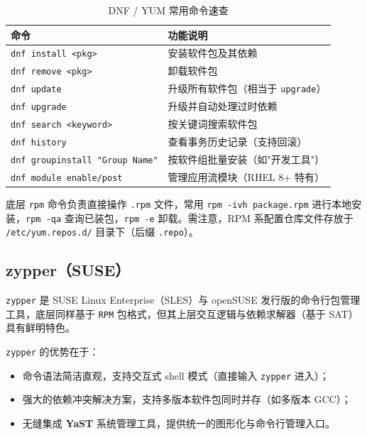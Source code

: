 \documentclass[12pt,UTF8]{ctexbook}
\begin{document}
\begin{table}[htbp]
	\centering
	\caption{DNF / YUM 常用命令速查}
	\begin{tabular}{@{}ll@{}}
		\toprule
		\textbf{命令} & \textbf{功能说明} \\
		\midrule
		\verb|dnf install <pkg>| & 安装软件包及其依赖 \\
		\verb|dnf remove <pkg>| & 卸载软件包 \\
		\verb|dnf update| & 升级所有软件包（相当于 \verb|upgrade|） \\
		\verb|dnf upgrade| & 升级并自动处理过时依赖 \\
		\verb|dnf search <keyword>| & 按关键词搜索软件包 \\
		\verb|dnf history| & 查看事务历史记录（支持回滚） \\
		\verb|dnf groupinstall "Group Name"| & 按软件组批量安装（如"开发工具"） \\
		\verb|dnf module enable/post| & 管理应用流模块（RHEL 8+ 特有） \\
		\bottomrule
	\end{tabular}
\end{table}

底层 \texttt{rpm} 命令负责直接操作 \texttt{.rpm} 文件，常用 \verb|rpm -ivh package.rpm| 进行本地安装，\verb|rpm -qa| 查询已装包，\verb|rpm -e| 卸载。需注意，RPM 系配置仓库文件存放于 \texttt{/etc/yum.repos.d/} 目录下（后缀 \texttt{.repo}）。

\subsection{zypper（SUSE）}

\texttt{zypper} 是 SUSE Linux Enterprise（SLES）与 openSUSE 发行版的命令行包管理工具，底层同样基于 \texttt{RPM} 包格式，但其上层交互逻辑与依赖求解器（基于 SAT）具有鲜明特色。

\texttt{zypper} 的优势在于：
\begin{itemize}
	\item 命令语法简洁直观，支持交互式 shell 模式（直接输入 \verb|zypper| 进入）；
	\item 强大的依赖冲突解决方案，支持多版本软件包同时并存（如多版本 GCC）；
	\item 无缝集成 \textbf{YaST} 系统管理工具，提供统一的图形化与命令行管理入口。
\end{itemize}
\end{document}
